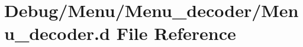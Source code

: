 \hypertarget{_menu__decoder_8d}{}\section{Debug/\+Menu/\+Menu\+\_\+decoder/\+Menu\+\_\+decoder.d File Reference}
\label{_menu__decoder_8d}
